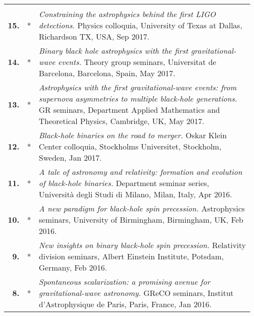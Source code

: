 \documentclass[letterpaper]{moderncv}
\begin{document}
{\begin{longtable}{rp{0.4cm}p{15.8cm}}
\vspace{0.05cm}\\
%
\textbf{15.} & *& \textit{Constraining the astrophysics behind the first LIGO detections.}
\newline{} 
Physics colloquia, University of Texas at Dallas, Richardson TX, USA, Sep 2017.
\vspace{0.05cm}\\
%
\textbf{14.} & *& \textit{Binary black hole astrophysics with the first gravitational-wave events.}
\newline{} 
Theory group seminars, Universitat de Barcelona, Barcelona, Spain, May 2017.
\vspace{0.05cm}\\
%
\textbf{13.} & *& \textit{Astrophysics with the first gravitational-wave events: from supernova asymmetries to multiple black-hole generations.}
\newline{} 
GR seminars, Department Applied Mathematics and Theoretical Physics, Cambridge, UK, May 2017.
\vspace{0.05cm}\\
%
\textbf{12.} & *& \textit{Black-hole binaries on the road to merger.}
\newline{} 
Oskar Klein Center colloquia, Stockholms Universitet, Stockholm, Sweden, Jan 2017.
\vspace{0.05cm}\\
%
\textbf{11.} & *& \textit{A tale of astronomy and relativity: formation and evolution of black-hole binaries.}
\newline{} 
Department seminar series, Università degli Studi di Milano, Milan, Italy, Apr 2016.
\vspace{0.05cm}\\
%
\textbf{10.} & *& \textit{A new paradigm for black-hole spin precession.}
\newline{} 
Astrophysics seminars, University of Birmingham, Birmingham, UK, Feb 2016.
\vspace{0.05cm}\\
%
\textbf{9.} & *& \textit{New insights on binary black-hole spin precession.}
\newline{} 
Relativity division seminars, Albert Einstein Institute, Potsdam, Germany, Feb 2016.
\vspace{0.05cm}\\
%
\textbf{8.} & *& \textit{Spontaneous scalarization: a promising avenue for gravitational-wave astronomy.}
\newline{} 
GReCO seminars, Institut d'Astrophysique de Paris, Paris, France, Jan 2016.

\end{longtable}}
\end{document}
